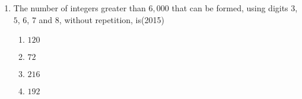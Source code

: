 \begin{enumerate}[label=\thesubsection.\arabic*,ref=\thesubsection.\theenumi]
		    \hfill{(2015)}
\begin{multicols}{4}
\begin{enumerate}    
    \item $ 52^{nd} $
    \item $ 58^{th} $
    \item $ 46^{th} $
    \item $ 59^{th} $
    \end{enumerate}
\end{multicols} 
\item The number of integers greater than $6, 000$ that can be formed,  using digits $3$, $5$, $6$, $7$ and $8$,  without repetition,  is\hfill{(2015)}
    \begin{multicols}{4}
\begin{enumerate}    
    \item $120$ 
    \item $72$
    \item $216$
    \item $192$ 
    \end{enumerate}
\end{multicols} 
\end{enumerate}
